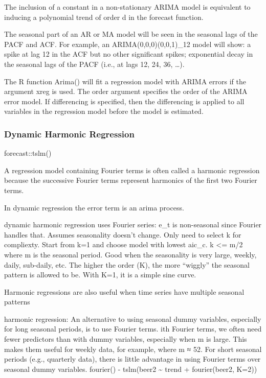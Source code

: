 \documentclass[]{book}
\begin{document}
The inclusion of a constant in a non-stationary ARIMA model is equivalent to inducing a polynomial trend of order d in the forecast function.

The seasonal part of an AR or MA model will be seen in the seasonal lags of the PACF and ACF. For example, an ARIMA(0,0,0)(0,0,1)\_12 model will show: a spike at lag 12 in the ACF but no other significant spikes; exponential decay in the seasonal lags of the PACF (i.e., at lags 12, 24, 36, \ldots{}).

The R function Arima() will fit a regression model with ARIMA errors if the argument xreg is used. The order argument specifies the order of the ARIMA error model. If differencing is specified, then the differencing is applied to all variables in the regression model before the model is estimated.

\hypertarget{dynamic-harmonic-regression}{%
\subsubsection{Dynamic Harmonic Regression}\label{dynamic-harmonic-regression}}

forecast::tslm()

A regression model containing Fourier terms is often called a harmonic regression because the successive Fourier terms represent harmonics of the first two Fourier terms.

In dynamic regression the error term is an arima process.

dynamic harmonic regression uses Fourier series: e\_t is non-seasonal since Fourier handles that. Assumes seasonality doesn't change. Only need to select k for compliexty. Start from k=1 and choose model with lowest aic\_c. k \textless{}= m/2 where m is the seasonal period. Good when the seasonality is very large, weekly, daily, sub-daily, etc. The higher the order (K), the more ``wiggly'' the seasonal pattern is allowed to be. With K=1, it is a simple sine curve.

Harmonic regressions are also useful when time series have multiple seasonal patterns

harmonic regression: An alternative to using seasonal dummy variables, especially for long seasonal periods, is to use Fourier terms. ith Fourier terms, we often need fewer predictors than with dummy variables, especially when m is large. This makes them useful for weekly data, for example, where m ≈ 52. For short seasonal periods (e.g., quarterly data), there is little advantage in using Fourier terms over seasonal dummy variables. fourier() - tslm(beer2 \textasciitilde{} trend + fourier(beer2, K=2))
\end{document}
